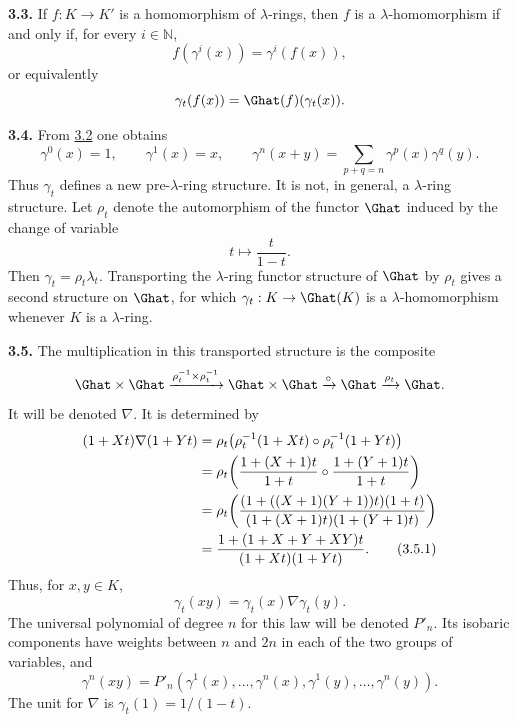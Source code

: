 \textbf{3.3.} If \(f:K\to K'\) is a homomorphism of \(\lambda\)-rings, then \(f\) is a \(\lambda\)-homomorphism if and only if, for every \(i\in\mathbb N\),
\[
  f(\gamma^i(x))=\gamma^i(f(x)),
\]
or equivalently
\[
  \gamma_t(f(x))=\Ghat(f)(\gamma_t(x)).
\]

\textbf{3.4.} From \hyperlink{sga6.e05.prop.3-2}{3.2} one obtains
\begin{equation}\tag{3.4.1}
  \gamma^0(x)=1,
  \qquad \gamma^1(x)=x,
  \qquad \gamma^n(x+y)=\sum_{p+q=n}\gamma^p(x)\gamma^q(y).
\end{equation}
Thus \(\gamma_t\) defines a new pre-\(\lambda\)-ring structure. It is not, in general, a \(\lambda\)-ring structure. Let \(\rho_t\) denote the automorphism of the functor \(\Ghat\) induced by the change of variable
\[
  t\longmapsto \frac{t}{1-t}.
\]
Then \(\gamma_t=\rho_t\lambda_t\). Transporting the \(\lambda\)-ring functor structure of \(\Ghat\) by \(\rho_t\) gives a second structure on \(\Ghat\), for which \(\gamma_t:K\to\Ghat(K)\) is a \(\lambda\)-homomorphism whenever \(K\) is a \(\lambda\)-ring.

\textbf{3.5.} The multiplication in this transported structure is the composite
\[
  \Ghat\times\Ghat\xrightarrow{\rho_t^{-1}\times\rho_t^{-1}}
  \Ghat\times\Ghat\xrightarrow{\circ}\Ghat\xrightarrow{\rho_t}\Ghat .
\]
It will be denoted \(\nabla\). It is determined by
\begin{align}
 (1+Xt)\nabla(1+Yt)
 &=\rho_t\!\left(\rho_t^{-1}(1+Xt)\circ\rho_t^{-1}(1+Yt)\right) \notag\\
 &=\rho_t\!\left(\frac{1+(X+1)t}{1+t}\circ
                 \frac{1+(Y+1)t}{1+t}\right) \notag\\
 &=\rho_t\!\left(\frac{(1+((X+1)(Y+1))t)(1+t)}
                      {(1+(X+1)t)(1+(Y+1)t)}\right) \notag\\
 &=\frac{1+(1+X+Y+XY)t}{(1+Xt)(1+Yt)} . \tag{3.5.1}
\end{align}
Thus, for \(x,y\in K\),
\begin{equation}\tag{3.5.2}
  \gamma_t(xy)=\gamma_t(x)\nabla\gamma_t(y).
\end{equation}
The universal polynomial of degree \(n\) for this law will be denoted \(P'_n\). Its isobaric components have weights between \(n\) and \(2n\) in each of the two groups of variables, and
\begin{equation}\tag{3.5.3}
  \gamma^n(xy)
  =P'_n(\gamma^1(x),\ldots,\gamma^n(x),
       \gamma^1(y),\ldots,\gamma^n(y)).
\end{equation}
The unit for \(\nabla\) is \(\gamma_t(1)=1/(1-t)\).

